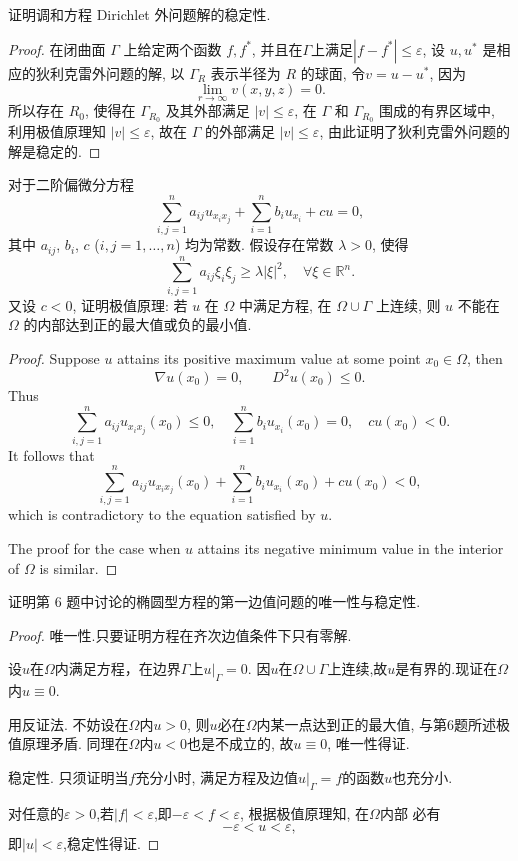 \begin{exercise}
  证明调和方程 Dirichlet 外问题解的稳定性.
\end{exercise}

\begin{proof}
  在闭曲面 $\varGamma$ 上给定两个函数 $f,f^*$, 并且在$\varGamma$上满足$|f-f^*|\leq\varepsilon$,
  设 $u,u^*$ 是相应的狄利克雷外问题的解, 以 $\varGamma_R$ 表示半径为 $R$ 的球面, 令$v=u-u^*$, 因为
  \[\lim_{r\to\infty}v(x,y,z)=0.\]
  所以存在 $R_0$, 使得在 $\varGamma_{R_0}$ 及其外部满足 $|v|\leq\varepsilon$,
  在 $\varGamma$ 和 $\varGamma_{R_0}$ 围成的有界区域中,
  利用极值原理知 $|v|\leq\varepsilon$, 故在 $\varGamma$ 的外部满足 $|v|\leq\varepsilon$,
  由此证明了狄利克雷外问题的解是稳定的.
\end{proof}


\begin{exercise}
  对于二阶偏微分方程
  \[\sum_{i,j=1}^n a_{ij} u_{x_ix_j} + \sum_{i=1}^n b_i u_{x_i} + cu = 0,\]
  其中 $a_{ij}$, $b_i$, $c$ ($i,j=1,\dots,n$) 均为常数. 假设存在常数 $\lambda>0$, 使得
  \[\sum_{i,j=1}^n a_{ij}\xi_i\xi_j \geq \lambda |\xi|^2,\quad \forall\xi\in\mathbb{R}^n.\]
  又设 $c<0$, 证明极值原理: 若 $u$ 在 $\varOmega$ 中满足方程, 在 $\varOmega\cup\varGamma$ 上连续,
  则 $u$ 不能在 $\varOmega$ 的内部达到正的最大值或负的最小值.
\end{exercise}

\begin{proof}
  Suppose $u$ attains its positive maximum value at some point $x_0\in\varOmega$, then
  \[\nabla u(x_0) = 0,\qquad D^2 u(x_0)\leq 0.\]
  Thus
  \[\sum_{i,j=1}^n a_{ij} u_{x_ix_j}(x_0) \leq 0,
    \quad \sum_{i=1}^n b_i u_{x_i}(x_0) = 0,\quad cu(x_0)<0.\]
  It follows that
  \[\sum_{i,j=1}^n a_{ij} u_{x_ix_j}(x_0) + \sum_{i=1}^n b_i u_{x_i}(x_0) + cu(x_0) <0,\]
  which is contradictory to the equation satisfied by $u$.

  The proof for the case when $u$ attains its negative minimum value in the interior of
  $\varOmega$ is similar.
\end{proof}


\begin{exercise}
  证明第 6 题中讨论的椭圆型方程的第一边值问题的唯一性与稳定性.
\end{exercise}

\begin{proof}
	唯一性.只要证明方程在齐次边值条件下只有零解.
	
	设$u$在$\varOmega$内满足方程，在边界$\varGamma$上$u|_\varGamma=0$. 因$u$在$\varOmega\cup\varGamma$上连续,故$u$是有界的.现证在$\varOmega$内$u\equiv0$.
	
	用反证法. 不妨设在$\varOmega$内$u>0$, 则$u$必在$\varOmega$内某一点达到正的最大值, 与第6题所述极值原理矛盾. 同理在$\Omega$内$u<0$也是不成立的, 故$u\equiv0$, 唯一性得证.
	
	稳定性. 只须证明当$f$充分小时, 满足方程及边值$u|_\Gamma=f$的函数$u$也充分小.
	
	对任意的$\varepsilon>0$,若$|f|<\varepsilon$,即$-\varepsilon<f<\varepsilon$, 根据极值原理知, 在$\varOmega$内部 必有
	\[-\varepsilon<u<\varepsilon,\]
	即$|u|<\varepsilon$,稳定性得证.
\end{proof}


